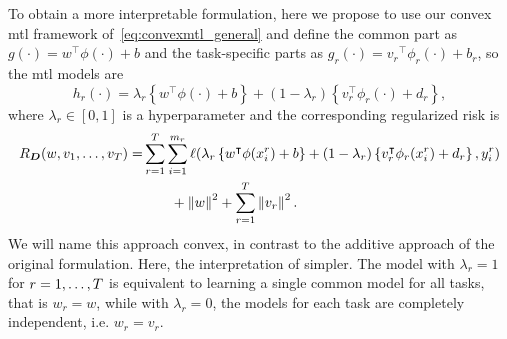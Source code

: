 To obtain a more interpretable formulation, here we propose to use our convex \acrshort{mtl} framework of~\eqref{eq:convexmtl_general} and define the common part as $g(\cdot) =  {w}^\intercal {\phi(\cdot)} + b$ and the task-specific parts as $g_r(\cdot) = {v_r}^\intercal {\phi_r(\cdot)} + b_r$, so the \acrshort{mtl} models are
\begin{equation}
    \nonumber
    \label{eq:convexmtl_modeldef}
    h_r(\cdot) = \lambda_r \left\lbrace {w}^\intercal {\phi(\cdot)} + b \right\rbrace + (1 - \lambda_r) \left\lbrace {v}_r^\intercal {\phi_r(\cdot)} + d_r \right\rbrace ,
\end{equation}
where $\lambda_r \in \left[0, 1\right]$ is a hyperparameter and the corresponding regularized risk is 
\begin{equation}
    \nonumber
    \begin{aligned}
        R_{\bm{D}} ({w, v_1, \ldots, v_T}) = &\sum_{r=1}^{T} \sum_{i=1}^{m_r} \ell(\lambda_r \left\lbrace {w}^\intercal {\phi(x_i^r)} + b \right\rbrace + (1 - \lambda_r) \left\lbrace {v}_r^\intercal {\phi_r(x_i^r)} + d_r \right\rbrace, y_i^r) \\ 
        &\qquad + \left\lVert{w}\right\rVert^2 + \sum_{r=1}^T \left\lVert{v}_r\right\rVert^2 .
    \end{aligned}
\end{equation}
We will name this approach {convex}, in contrast to the {additive} approach of the original formulation.
Here, the interpretation of simpler. The model with $\lambda_r = 1$ for $r=1, \ldots, T$ is equivalent to learning a single common model for all tasks, that is ${w}_r = {w}$, while with $\lambda_r=0$, the models for each task are completely independent, i.e. ${w}_r = {v}_r$.
%

